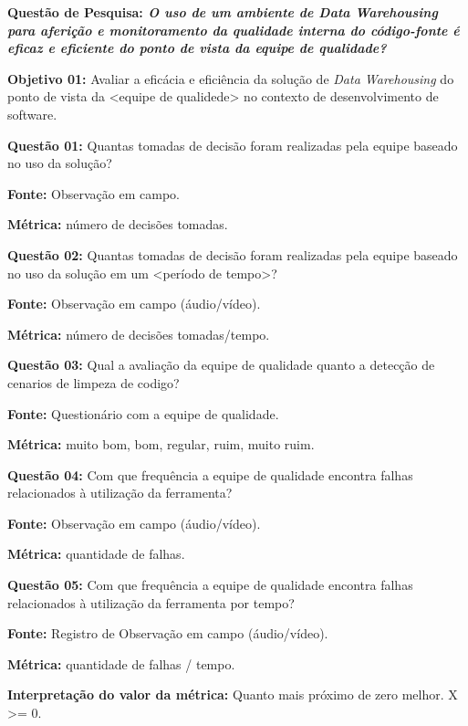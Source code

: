 \textbf{Questão de Pesquisa: \textit{O uso de um ambiente de Data Warehousing para aferição e monitoramento da qualidade interna do código-fonte é eficaz e eficiente do ponto de vista da equipe de qualidade?}}

\textbf{Objetivo 01:} Avaliar a eficácia e eficiência da solução de \textit{Data Warehousing} do ponto de vista da <equipe de qualidede> no contexto de desenvolvimento de software. \newline


\textbf{Questão 01:} Quantas tomadas de decisão foram realizadas pela equipe baseado no uso da solução?

\textbf{Fonte:} Observação em campo.

\textbf{Métrica:} número de decisões tomadas. \newline

\textbf{Questão 02:} Quantas tomadas de decisão foram realizadas pela equipe baseado no uso da solução em um <período de tempo>?

\textbf{Fonte:} Observação em campo (áudio/vídeo).

\textbf{Métrica:} número de decisões tomadas/tempo. \newline


\textbf{Questão 03:} Qual a avaliação da equipe de qualidade quanto a detecção de cenarios de limpeza de codigo?

\textbf{Fonte:} Questionário com a equipe de qualidade.

\textbf{Métrica:} muito bom, bom, regular, ruim, muito ruim. \newline


\textbf{Questão 04:} Com que frequência a equipe de qualidade encontra falhas relacionados à utilização da ferramenta?

\textbf{Fonte:} Observação em campo (áudio/vídeo).

\textbf{Métrica:} quantidade de falhas. \newline


\textbf{Questão 05:} Com que frequência a equipe de qualidade encontra falhas relacionados à utilização da ferramenta por tempo?

\textbf{Fonte:} Registro de Observação em campo (áudio/vídeo).

\textbf{Métrica:} quantidade de falhas / tempo. 

\textbf{Interpretação do valor da métrica:} Quanto mais próximo de zero melhor. X >= 0. \newline


